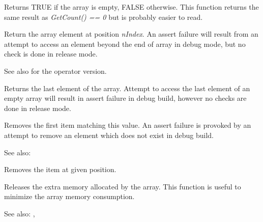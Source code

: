 \label{wxarraystringisempty}


Returns TRUE if the array is empty, FALSE otherwise. This function returns the
same result as {\it GetCount() == 0} but is probably easier to read.

\label{wxarraystringitem}


Return the array element at position {\it nIndex}. An assert failure will
result from an attempt to access an element beyond the end of array in debug
mode, but no check is done in release mode.

See also  for the operator
version.

\label{wxarraystringlast}


Returns the last element of the array. Attempt to access the last element of
an empty array will result in assert failure in debug build, however no checks
are done in release mode.

\label{wxarraystringremove}


Removes the first item matching this value. An assert failure is provoked by
an attempt to remove an element which does not exist in debug build.

See also: 


Removes the item at given position.

\label{wxarraystringshrink}


Releases the extra memory allocated by the array. This function is useful to
minimize the array memory consumption.

See also: , 

\label{wxarraystringsort}


